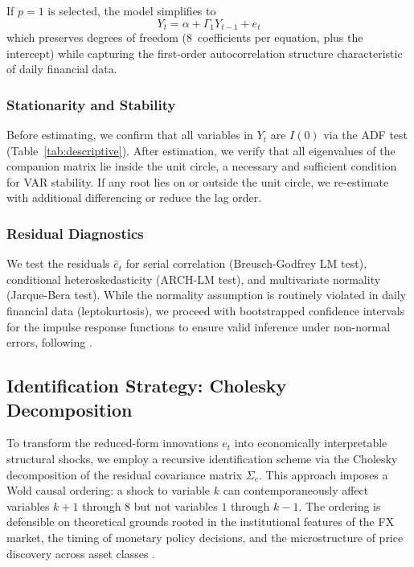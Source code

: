 \documentclass[12pt]{article}
\begin{document}
{} If $p = 1$ is selected, the model simplifies to
\begin{equation}
Y_t = \alpha + \Gamma_1 Y_{t-1} + e_t
\end{equation}
which preserves degrees of freedom (8~coefficients per equation, plus the intercept) while capturing the first-order autocorrelation structure characteristic of daily financial data.

\subsubsection{Stationarity and Stability}

{} Before estimating, we confirm that all variables in $Y_t$ are $I(0)$ via the ADF test (Table~\ref{tab:descriptive}). After estimation, we verify that all eigenvalues of the companion matrix lie inside the unit circle, a necessary and sufficient condition for VAR stability. If any root lies on or outside the unit circle, we re-estimate with additional differencing or reduce the lag order.

\subsubsection{Residual Diagnostics}

{} We test the residuals $\hat{e}_t$ for serial correlation (Breusch-Godfrey LM test), conditional heteroskedasticity (ARCH-LM test), and multivariate normality (Jarque-Bera test). While the normality assumption is routinely violated in daily financial data (leptokurtosis), we proceed with bootstrapped confidence intervals for the impulse response functions to ensure valid inference under non-normal errors, following \textcite{guyot2026risk}.

\subsection{Identification Strategy: Cholesky Decomposition}

{} To transform the reduced-form innovations $e_t$ into economically interpretable structural shocks, we employ a recursive identification scheme via the Cholesky decomposition of the residual covariance matrix $\Sigma_e$. This approach imposes a Wold causal ordering: a shock to variable $k$ can contemporaneously affect variables $k+1$ through $8$ but not variables $1$ through $k-1$. The ordering is defensible on theoretical grounds rooted in the institutional features of the FX market, the timing of monetary policy decisions, and the microstructure of price discovery across asset classes \parencite{guyot2026risk}.
\end{document}
